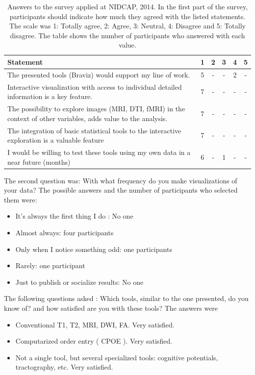 \begin{table}
	\centering
		\begin{tabular}{p{}ccccc}
			\toprule
			Statement&1&2&3&4&5 \\
			\midrule
			The presented tools (Braviz) would support my line of work. & 5 &-&-& 2 &- \\
			Interactive visualization with access to individual detailed information is a key feature. &7&-&-&-&- \\			
			The possibility to explore images (MRI, DTI, fMRI) in the context of other variables, adds value to the analysis. &7&-&-&-&- \\
			The integration of basic statistical tools to the interactive exploration is a valuable feature &7&-&-&-&- \\
			I would be willing to test these tools using my own data in a near future (months) & 6 &-& 1 &-&- \\
			\bottomrule
		\end{tabular}
	\caption{Answers to the survey applied at NIDCAP, 2014. In the first part of the survey, participants should indicate how much they agreed with the listed statements. The scale was
	1: Totally agree, 2: Agree, 3: Neutral, 4: Disagree and 5: Totally disagree. The table shows the number of participants who answered with each value.}
	\label{tab_nidcap_likert}
\end{table}

The second question was: With what frequency do you make visualizations of your data? The possible answers and the number of participants who selected them were:

\begin{itemize}
	\item It's always the first thing I do : No one
	\item Almost always: four participants
	\item Only when I notice something odd: one participants
	\item Rarely: one participant
	\item Just to publish or socialize results: No one
\end{itemize}

The following questions asked : Which tools, similar to the one presented, do you know of? and how satisfied are you with these tools? The answers were 
\begin{itemize}
	\item Conventional T1, T2, MRI, DWI, FA. Very satisfied.
	\item Computarized order entry ( CPOE ). Very satisfied.
	\item Not a single tool, but several specialized tools: cognitive potentials, tractography, etc. Very satisfied.
\end{itemize}

